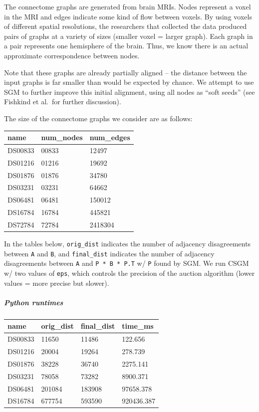 \documentclass[10pt,oneside]{memoir}
\let\oldsubparagraph\subparagraph
\renewcommand{\subparagraph}[1]{\oldsubparagraph{#1}\mbox{}}
\begin{document}
The connectome graphs are generated from brain MRIs. Nodes represent a
voxel in the MRI and edges indicate some kind of flow between voxels. By
using voxels of different spatial resolutions, the researchers that
collected the data produced pairs of graphs at a variety of sizes
(smaller voxel = larger graph). Each graph in a pair represents one
hemisphere of the brain. Thus, we know there is an actual approximate
correspondence between nodes.

Note that these graphs are already partially aligned -- the distance
between the input graphs is far smaller than would be expected by
chance. We attempt to use SGM to further improve this initial alignment,
using all nodes as ``soft seeds'' (see Fishkind et al.~for further
discussion).

The size of the connectome graphs we consider are as follows:

\begin{longtable}[]{@{}lll@{}}
\toprule
name & num\_nodes & num\_edges\tabularnewline
\midrule
\endhead
DS00833 & 00833 & 12497\tabularnewline
DS01216 & 01216 & 19692\tabularnewline
DS01876 & 01876 & 34780\tabularnewline
DS03231 & 03231 & 64662\tabularnewline
DS06481 & 06481 & 150012\tabularnewline
DS16784 & 16784 & 445821\tabularnewline
DS72784 & 72784 & 2418304\tabularnewline
\bottomrule
\end{longtable}

In the tables below, \texttt{orig\_dist} indicates the number of
adjacency disagreements between \texttt{A} and \texttt{B}, and
\texttt{final\_dist} indicates the number of adjacency disagreements
between \texttt{A} and \texttt{P\ *\ B\ *\ P.T} w/ \texttt{P} found by
SGM. We run CSGM w/ two values of \texttt{eps}, which controls the
precision of the auction algorithm (lower values = more precise but
slower).

\hypertarget{python-runtimes}{%
\subparagraph{Python runtimes}\label{python-runtimes}}

\begin{longtable}[]{@{}llll@{}}
\toprule
name & orig\_dist & final\_dist & time\_ms\tabularnewline
\midrule
\endhead
DS00833 & 11650 & 11486 & 122.656\tabularnewline
DS01216 & 20004 & 19264 & 278.739\tabularnewline
DS01876 & 38228 & 36740 & 2275.141\tabularnewline
DS03231 & 78058 & 73282 & 8900.371\tabularnewline
DS06481 & 201084 & 183908 & 97658.378\tabularnewline
DS16784 & 677754 & 593590 & 920436.387\tabularnewline
\bottomrule
\end{longtable}
\end{document}
